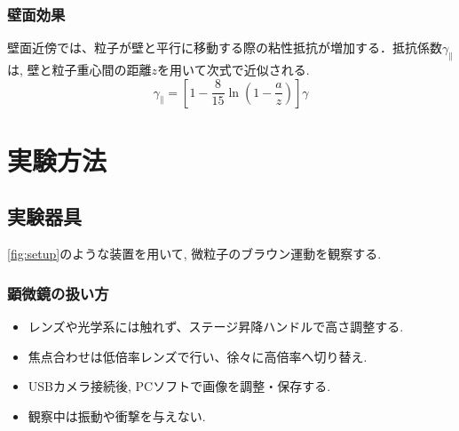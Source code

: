 \documentclass[11pt]{ltjsarticle}
\begin{document}
      \subsubsection*{壁面効果}
      壁面近傍では、粒子が壁と平行に移動する際の粘性抵抗が増加する．抵抗係数$\gamma_\parallel$は, 壁と粒子重心間の距離$z$を用いて次式で近似される.
      \begin{equation}
        \gamma_\parallel = \left[ 1 - \frac{8}{15} \ln \left( 1 - \frac{a}{z} \right) \right] \gamma
        \label{eq:wall_effect}
      \end{equation}
  \section*{実験方法}
    \subsection*{実験器具}
    \begin{minipage}{0.58\columnwidth}
      \cref{fig:setup}のような装置を用いて, 微粒子のブラウン運動を観察する.
      \subsubsection*{顕微鏡の扱い方}
        \begin{itemize}
          \item レンズや光学系には触れず、ステージ昇降ハンドルで高さ調整する.
          \item 焦点合わせは低倍率レンズで行い、徐々に高倍率へ切り替え.
          \item USBカメラ接続後, PCソフトで画像を調整・保存する.
          \item 観察中は振動や衝撃を与えない.
        \end{itemize}
    \end{minipage}
\end{document}
